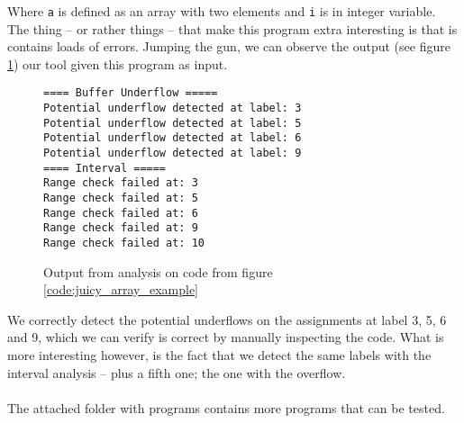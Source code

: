 Where \texttt{a} is defined as an array with two elements and \texttt{i} is in integer variable. The thing -- or rather things -- that make this program extra interesting is that is contains loads of errors. Jumping the gun, we can observe the output (see figure \ref{code:juicy_array_example_output}) our tool given this program as input.
\begin{figure}[H]
  \begin{lstlisting}[numbers=none]
==== Buffer Underflow =====
Potential underflow detected at label: 3
Potential underflow detected at label: 5
Potential underflow detected at label: 6
Potential underflow detected at label: 9
==== Interval =====
Range check failed at: 3
Range check failed at: 5
Range check failed at: 6
Range check failed at: 9
Range check failed at: 10
\end{lstlisting}
\caption{Output from analysis on code from figure \ref{code:juicy_array_example}}
\label{code:juicy_array_example_output}
\end{figure}
We correctly detect the potential underflows on the assignments at label 3, 5, 6 and 9, which we can verify is correct by manually inspecting the code. What is more interesting however, is the fact that we detect the same labels with the interval analysis -- plus a fifth one; the one with the overflow.
\\\\
The attached folder with programs contains more programs that can be tested.